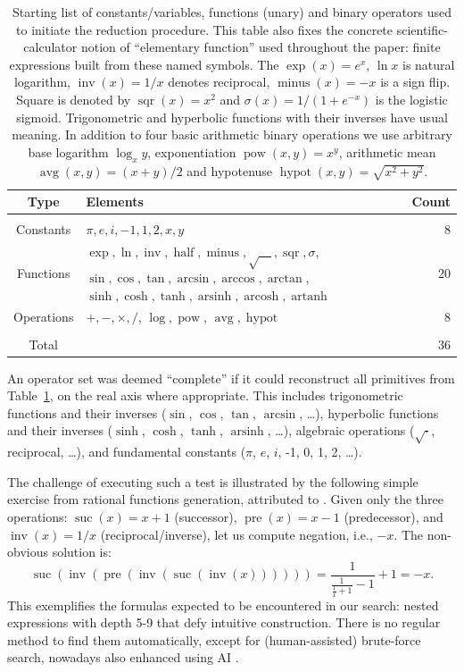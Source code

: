 \documentclass[12pt]{article}
\DeclareMathOperator{\pre}{pre}
\DeclareMathOperator{\suc}{suc}
\DeclareMathOperator{\inv}{inv}
\DeclareMathOperator{\half}{half}
\DeclareMathOperator{\sqr}{sqr}
\DeclareMathOperator{\minus}{minus}
\DeclareMathOperator{\arsinh}{arsinh}
\DeclareMathOperator{\arcosh}{arcosh}
\DeclareMathOperator{\artanh}{artanh}
\DeclareMathOperator{\pow}{pow}
\DeclareMathOperator{\avg}{avg}
\DeclareMathOperator{\hypot}{hypot}
\begin{document}
\begin{table}
\caption{\label{Calc4} Starting list of constants/variables, functions (unary) and binary operators used to initiate the reduction procedure. This table also fixes the concrete scientific-calculator notion of ``elementary function'' used throughout the paper: finite expressions built from these named symbols. The $\exp{(x)} = e^x$, $\ln{x}$ is natural logarithm, $\inv{(x)} = 1/x$ denotes reciprocal, $\minus{(x)} = -x$ is a sign flip. Square is denoted by $\sqr{(x)} = x^2$ and $\sigma{(x)} = 1/(1+e^{-x})$ is the logistic sigmoid. Trigonometric and hyperbolic functions with their inverses have usual meaning. In addition to four basic arithmetic binary operations we use arbitrary base logarithm $\log_x{y}$, exponentiation $\pow{(x,y)} = x^y$, arithmetic mean $\avg{(x,y)} = (x+y)/2$ and hypotenuse $\hypot{(x,y)} = \sqrt{x^2+y^2}$.}
\begin{tabular}{c| l | r}
Type       & Elements & Count \\ \hline \\
Constants  & $\pi, e, i, -1, 1, 2, x, y$  & 8 \\[6pt]
Functions  & \parbox{0.6\columnwidth}{$\exp, \ln, \inv, \half, \minus, \sqrt{\quad}, \sqr, \sigma$, $\sin, \cos, \tan, \arcsin, \arccos, \arctan$, $\sinh, \cosh, \tanh, \arsinh, \arcosh, \artanh$} & 20 \\[12pt]
Operations & $+, -, \times, /$, $\log, \pow$, $\avg, \hypot$     & 8 \\[6pt]
\hline \\
Total      &          & 36
\end{tabular}
\end{table}



An operator set was deemed ``complete'' if it could reconstruct all primitives from Table~\ref{Calc4}, on the real axis where appropriate. This includes trigonometric functions and their inverses ($\sin$, $\cos$, $\tan$, $\arcsin$, \ldots), hyperbolic functions and their inverses ($\sinh$, $\cosh$, $\tanh$, $\arsinh$, \ldots), algebraic operations ($\sqrt{\cdot}$, reciprocal, \ldots), and fundamental constants ($\pi$, $e$, $i$, -1, 0, 1, 2, \ldots ).


The challenge of executing such a test is illustrated by the following simple exercise from rational functions generation, attributed to \cite{Newman1982ProblemSeminar}. Given only the three operations:  $\suc(x) = x+1$ (successor), 
$\pre(x) = x-1$ (predecessor), and $\inv(x) = 1/x$ (reciprocal/inverse), let us compute negation, i.e.,  $-x$. The non-obvious solution is:
$$
\suc(\inv(\pre(\inv(\suc(\inv(x)))))) = \frac{1}{\frac{1}{\frac{1}{x}+1}-1}+1 = -x.
$$
This exemplifies the formulas expected to be encountered in our search: nested expressions with depth 5-9 that defy intuitive construction. There is no regular method to find them automatically, except for (human-assisted) brute-force search, nowadays also enhanced using AI \cite{Naskrecki2025}.
\end{document}

